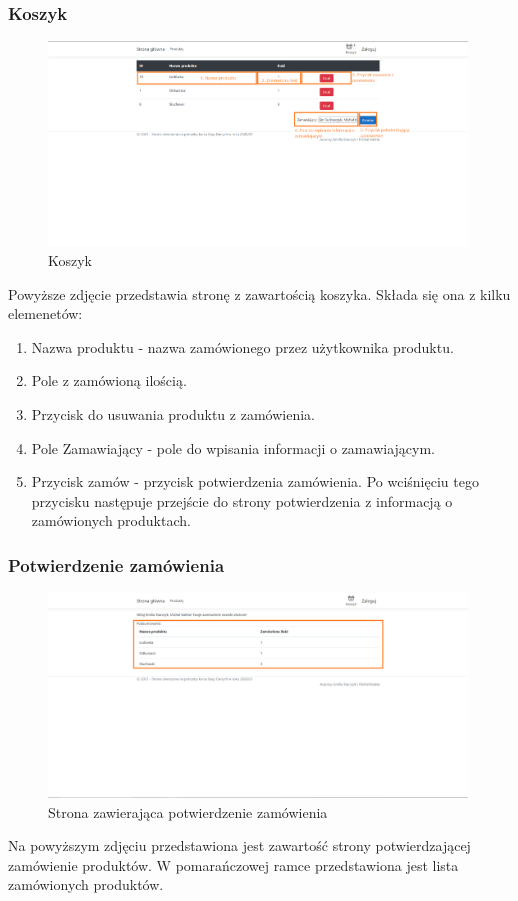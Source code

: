 \documentclass{article}
\begin{document}
\subsubsection{Koszyk}
\begin{figure}[H]
   \centering
   \includegraphics[width=0.99\textwidth,frame]{Wyglad/koszyk_uzytkownik.png}
   \caption{Koszyk}
\end{figure}
Powyższe zdjęcie przedstawia stronę z zawartością koszyka. Składa się ona z kilku elemenetów:
\begin{enumerate}
   \item Nazwa produktu - nazwa zamówionego przez użytkownika produktu.
   \item Pole z zamówioną ilością.
   \item Przycisk do usuwania produktu z zamówienia.
   \item Pole Zamawiający - pole do wpisania informacji o zamawiającym.
   \item Przycisk zamów - przycisk potwierdzenia zamówienia. Po wciśnięciu tego przycisku następuje
         przejście do strony potwierdzenia z informacją o zamówionych produktach.
\end{enumerate}

\subsubsection{Potwierdzenie zamówienia}
\begin{figure}[H]
   \centering
   \includegraphics[width=0.99\textwidth,frame]{Wyglad/zlozenie_zamowienia_uzytkownik.png}
   \caption{Strona zawierająca potwierdzenie zamówienia}
\end{figure}
Na powyższym zdjęciu przedstawiona jest zawartość strony potwierdzającej zamówienie produktów. W
pomarańczowej ramce przedstawiona jest lista zamówionych produktów.
\end{document}
